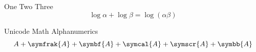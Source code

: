 \documentclass[a4paper]{article}
\begin{document}
	One Two Three
	\[
	\log \alpha + \log \beta = \log(\alpha\beta)
	\]
	
	Unicode Math Alphanumerics
	\[
	A + \symfrak{A}+\symbf{A}+ \symcal{A} + \symscr{A}+ \symbb{A}
	\]
\end{document}
